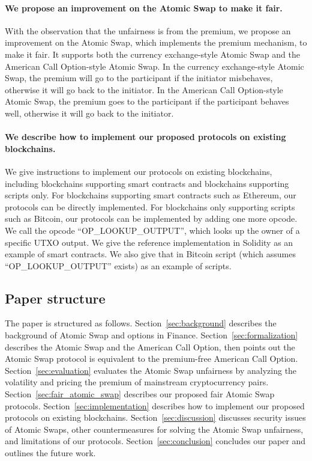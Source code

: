 \paragraph{We propose an improvement on the Atomic Swap to make it fair.}
With the observation that the unfairness is from the premium,
we propose an improvement on the Atomic Swap, which implements the premium mechanism, to make it fair.
It supports both the currency exchange-style Atomic Swap and the American Call Option-style Atomic Swap.
In the currency exchange-style Atomic Swap, the premium will go to the participant if the initiator misbehaves, otherwise it will go back to the initiator.
In the American Call Option-style Atomic Swap, the premium goes to the participant if the participant behaves well, otherwise it will go back to the initiator.


\paragraph{We describe how to implement our proposed protocols on existing blockchains.}
We give instructions to implement our protocols on existing blockchains,
including blockchains supporting smart contracts and blockchains supporting scripts only.
For blockchains supporting smart contracts such as Ethereum, our protocols can be directly implemented.
For blockchains only supporting scripts such as Bitcoin, our protocols can be implemented by adding one more opcode.
We call the opcode ``OP\_LOOKUP\_OUTPUT'', which looks up the owner of a specific UTXO output.
We give the reference implementation in Solidity as an example of smart contracts.
We also give that in Bitcoin script (which assumes ``OP\_LOOKUP\_OUTPUT'' exists) as an example of scripts.










\subsection{Paper structure}

The paper is structured as follows.
Section~\ref{sec:background} describes the background of Atomic Swap and options in Finance.
Section~\ref{sec:formalization} describes the Atomic Swap and the American Call Option, then points out the Atomic Swap protocol is equivalent to the premium-free American Call Option.
Section~\ref{sec:evaluation} evaluates the Atomic Swap unfairness by analyzing the volatility and pricing the premium of mainstream cryptocurrency pairs.
Section~\ref{sec:fair_atomic_swap} describes our proposed fair Atomic Swap protocols.
Section~\ref{sec:implementation} describes how to implement our proposed protocols on existing blockchains.
Section~\ref{sec:discussion} discusses security issues of Atomic Swaps, other countermeasures for solving the Atomic Swap unfairness, and limitations of our protocols.
Section~\ref{sec:conclusion} concludes our paper and outlines the future work.
